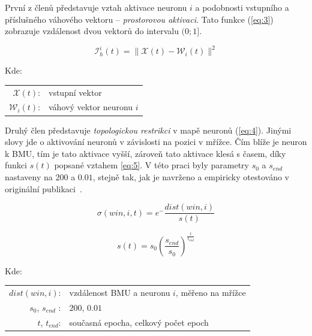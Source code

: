 \documentclass[thesis=M,czech]{FITthesis}[2012/06/26]
\begin{document}
První z členů představuje vztah aktivace neuronu $i$  a podobnosti vstupního a příslušného váhového vektoru -- \textit{prostorovou aktivaci}. Tato funkce (\ref{eq:3}) zobrazuje vzdálenost dvou vektorů do intervalu $(0;1]$.


\vspace{\baselineskip}
\noindent
\begin{minipage}[c]{\textwidth }
\begin{equation} \label{eq:3}
    \mathcal{I}_h^i(t) = \|\mathcal{X}(t)-\mathcal{W}_i(t)\|^2   
\end{equation}

Kde:\\
\hspace*{3em}
\begin{tabular}{rl}
    $\mathcal{X}(t)$:& vstupní vektor \\
    $\mathcal{W}_i(t)$:& váhový vektor neuronu $i$ \\
\end{tabular}
\end{minipage} 
\vspace{\baselineskip}
\noindent

 

Druhý člen představuje \textit{topologickou restrikci} v mapě neuronů (\ref{eq:4}). Jinými slovy jde o aktivování neuronů v závislosti na pozici v mřížce. Čím blíže je neuron k BMU, tím je tato aktivace vyšší, zároveň tato aktivace klesá s časem, díky funkci $s(t)$ popsané vztahem \ref{eq:5}.  
V této praci byly parametry $s_0$ a $s_{end}$ nastaveny na $200$ a $0.01$, stejně tak, jak je navrženo a empiricky otestováno v originální publikaci~\cite{hartonomain}.


\vspace{\baselineskip}
\noindent
\begin{minipage}[c]{\textwidth }

\begin{equation} \label{eq:4}
    \sigma(win, i, t)=e^-\frac{dist(win, i)}{s(t)}  
\end{equation}

\begin{equation} \label{eq:5}
    {s(t)=s_0(\frac{s_{end}}{s_0})^\frac{t}{t_{end}}}  
\end{equation}

Kde:\\
\hspace*{3em}
\begin{tabular}{rl}
    $dist(win, i)$:& vzdálenost BMU a neuronu $i$, měřeno na mřížce \\
    $s_0$, $s_{end}$ :& $200$, $0.01$ \\
     $t$, $t_{end}$:& současná epocha, celkový počet epoch \\
\end{tabular}
\end{minipage} 
\vspace{\baselineskip}
\noindent
\end{document}
